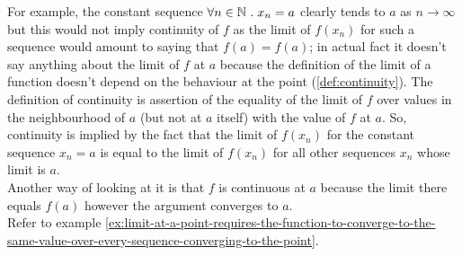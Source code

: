 \documentclass[../MathsNotesBase.tex]{subfiles}
\begin{document}
	For example, the constant sequence ${ \forall n \in \mathbb{N}^{} \;.\; x_n = a }$ clearly tends to $a$ as ${ n \to \infty }$ but this would not imply continuity of $f$ as the limit of $f(x_n)$ for such a sequence would amount to saying that ${ f(a) = f(a) }$; in actual fact it doesn't say anything about the limit of $f$ at $a$ because the definition of the limit of a function doesn't depend on the behaviour at the point (\ref{def:continuity}). The definition of continuity is assertion of the equality of the limit of $f$ over values in the neighbourhood of $a$ (but not at $a$ itself) with the value of $f$ at $a$. So, continuity is implied by the fact that the limit of $f(x_n)$ for the constant sequence $x_n = a$ is equal to the limit of $f(x_n)$ for all other sequences $x_n$ whose limit is $a$.\\
	
	Another way of looking at it is that $f$ is continuous at $a$ because the limit there equals $f(a)$ however the argument converges to $a$.\\
	
	Refer to example \ref{ex:limit-at-a-point-requires-the-function-to-converge-to-the-same-value-over-every-sequence-converging-to-the-point}.
	
\end{document}
